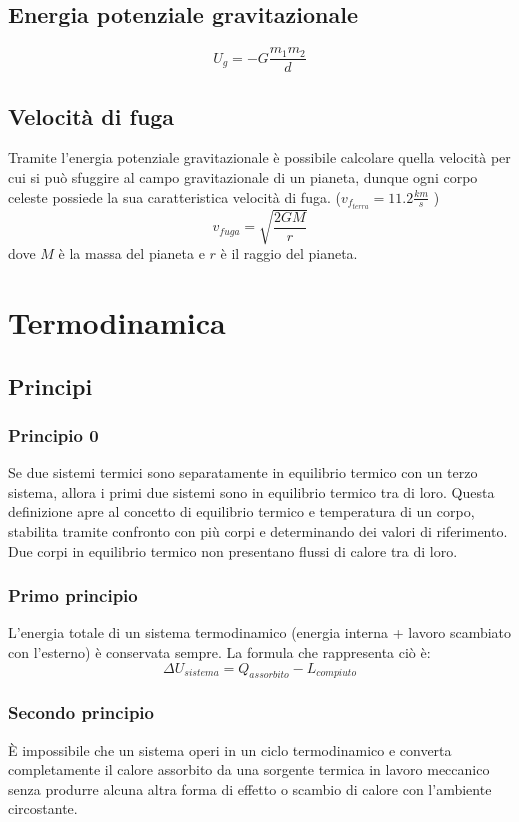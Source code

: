 \documentclass[a4paper]{article}
\theoremstyle{break}
\theoremstyle{break}
\theoremstyle{break}
\theoremstyle{break}
\begin{document}
\subsection{Energia potenziale gravitazionale}
\[
  U_g = -G \frac{m_1 m_2}{d}
\] 

\subsection{Velocità di fuga}
Tramite l’energia potenziale gravitazionale è possibile calcolare quella velocità
per cui si può sfuggire al campo gravitazionale di un pianeta, dunque ogni
corpo celeste possiede la sua caratteristica velocità di fuga. (\( v_{f_{terra}} = 11.2 \frac{km}{s} \) )
\[
  v_{fuga} = \sqrt{\frac{2 G M}{r}}
\] 
dove \( M \) è la massa del pianeta e \( r \) è il raggio del pianeta.

\section{Termodinamica}
\subsection{Principi}
\subsubsection{Principio 0}
Se due sistemi termici sono separatamente in equilibrio termico con un terzo sistema, allora i primi
due sistemi sono in equilibrio termico tra di loro. Questa definizione apre al concetto di equilibrio
termico e temperatura di un corpo, stabilita tramite confronto con più corpi e determinando dei
valori di riferimento. Due corpi in equilibrio termico non presentano flussi di calore tra di loro.

\subsubsection{Primo principio}
L’energia totale di un sistema termodinamico (energia interna + lavoro scambiato con l’esterno) è
conservata sempre. La formula che rappresenta ciò è:
\[
  \Delta U_{sistema} = Q_{assorbito} - L_{compiuto}
\] 

\subsubsection{Secondo principio}
È impossibile che un sistema operi in un ciclo termodinamico e converta completamente il calore
assorbito da una sorgente termica in lavoro meccanico senza produrre alcuna altra forma di effetto
o scambio di calore con l'ambiente circostante.
\end{document}
